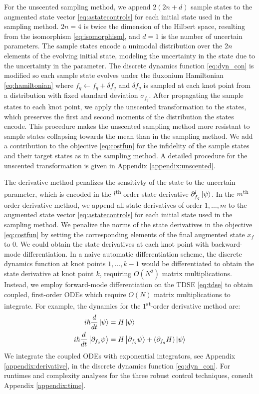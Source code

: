 For the unscented sampling method, we append $2(2n + d)$ sample
states to the augmented state vector \eqref{eq:astatecontrols}
for each initial state used in the sampling method. $2n = 4$ is twice the
dimension of the Hilbert space, resulting from the isomorphism \eqref{eq:isomorphism},
and $d = 1$ is the number of uncertain parameters. The sample states
encode a unimodal distribution over the $2n$
elements of the evolving initial state, modeling
the uncertainty in the state due to the uncertainty in the parameter.
The discrete dynamics function \eqref{eq:dyn_con} is modified
so each sample state evolves under the fluxonium Hamiltonian
\eqref{eq:hamiltonian} where $f_{q} \gets f_{q} + \delta f_{q}$
and $\delta f_{q}$ is sampled at each knot point from a distribution
with fixed standard deviation $\sigma_{f_{q}}$.
After propagating the sample states to each knot point, we apply the unscented
transformation to the states, which
preserves the first and second moments of the distribution the states encode.
This procedure makes the unscented sampling method more resistant to sample
states collapsing towards the mean than in the sampling method.
We add a contribution to the objective \eqref{eq:costfun} for the infidelity
of the sample states and their target states
as in the sampling method.
A detailed procedure for the unscented transformation is given
in Appendix \ref{appendix:unscented}.

The derivative method penalizes the sensitivty of the state
to the uncertain parameter, which is encoded in the $l$\textsuperscript{th}-order
state derivative $\partial_{f_{q}}^{l} \ket{\psi}$. In the $m$\textsuperscript{th}-order
derivative method, we append all state derivatives of order $1, \dots, m$
to the augmented state vector \eqref{eq:astatecontrols}
for each initial state used in the sampling method.
We penalize the norms of the state derivatives
in the objective \eqref{eq:costfun} by setting the corresponding elements
of the final augmented state $x_{f}$ to $0$.
We could obtain the state derivatives at each knot point
with backward-mode differentiation.
In a naive automatic differentiation scheme,
the discrete dynamics function at knot points
$1, \dots, k - 1$ would be differentiated to obtain the state
derivative at knot point $k$, requiring
$O(N^{2})$ matrix multiplications. Instead, we 
employ forward-mode differentiation on the TDSE \eqref{eq:tdse}
to obtain coupled, first-order ODEs
which require $O(N)$ matrix multiplications to integrate.
For example, the dynamics for the $1$\textsuperscript{st}-order derivative method are:
\begin{align}
  i \hbar \frac{d}{dt} \ket{\psi} &= H \ket{\psi}\\
  i \hbar \frac{d}{dt} \ket{\partial_{f_{q}}\psi} &=
  H \ket{\partial_{f_{q}} \psi} +
  (\partial_{f_{q}} H) \ket{\psi}
  \label{eq:d1dyn}
\end{align}
We integrate the coupled ODEs with exponential
integrators, see Appendix \ref{appendix:derivative},
in the discrete dynamics function \eqref{eq:dyn_con}. For runtimes
and complexity analyses for the three robust control techniques,
consult Appendix \ref{appendix:time}.

